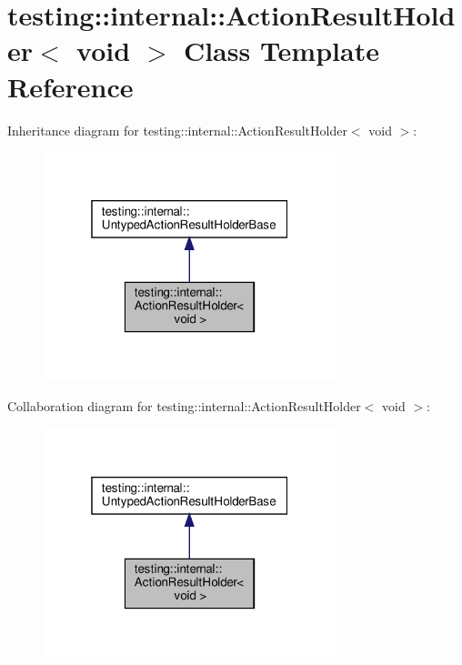 \hypertarget{classtesting_1_1internal_1_1_action_result_holder_3_01void_01_4}{}\section{testing\+:\+:internal\+:\+:Action\+Result\+Holder$<$ void $>$ Class Template Reference}
\label{classtesting_1_1internal_1_1_action_result_holder_3_01void_01_4}


Inheritance diagram for testing\+:\+:internal\+:\+:Action\+Result\+Holder$<$ void $>$\+:
\nopagebreak
\begin{figure}[H]
\begin{center}
\leavevmode
\includegraphics[width=241pt]{classtesting_1_1internal_1_1_action_result_holder_3_01void_01_4__inherit__graph}
\end{center}
\end{figure}


Collaboration diagram for testing\+:\+:internal\+:\+:Action\+Result\+Holder$<$ void $>$\+:
\nopagebreak
\begin{figure}[H]
\begin{center}
\leavevmode
\includegraphics[width=241pt]{classtesting_1_1internal_1_1_action_result_holder_3_01void_01_4__coll__graph}
\end{center}
\end{figure}
